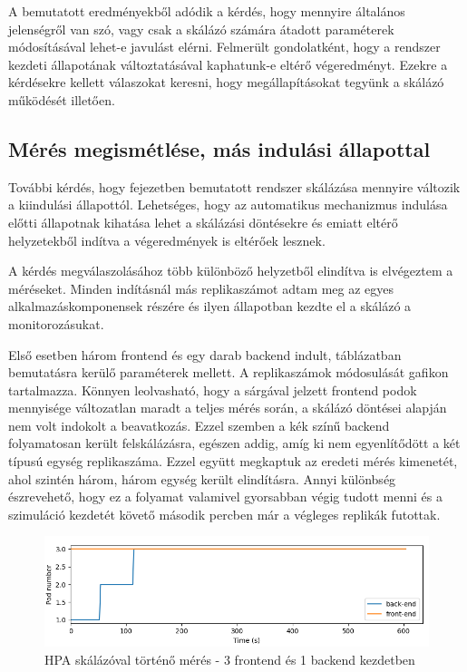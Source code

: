 A bemutatott eredményekből adódik a kérdés, hogy mennyire általános jelenségről van szó, vagy csak a skálázó számára átadott paraméterek módosításával lehet-e javulást elérni.
Felmerült gondolatként, hogy a rendszer kezdeti állapotának változtatásával kaphatunk-e eltérő végeredményt.
Ezekre a kérdésekre kellett válaszokat keresni, hogy megállapításokat tegyünk a skálázó működését illetően.


\subsection{Mérés megismétlése, más indulási állapottal}
További kérdés, hogy  fejezetben bemutatott rendszer skálázása mennyire változik a kiindulási állapottól.
Lehetséges, hogy az automatikus mechanizmus indulása előtti állapotnak kihatása lehet a skálázási döntésekre és emiatt eltérő helyzetekből indítva a végeredmények is eltérőek lesznek.

A kérdés megválaszolásához több különböző helyzetből elindítva is elvégeztem a méréseket. 
Minden indításnál más replikaszámot adtam meg az egyes alkalmazáskomponensek részére és ilyen állapotban kezdte el a skálázó a monitorozásukat.

Első esetben három frontend és egy darab backend indult,  táblázatban bemutatásra kerülő paraméterek mellett.
A replikaszámok módosulását  gafikon tartalmazza.
Könnyen leolvasható, hogy a sárgával jelzett frontend podok mennyisége változatlan maradt a teljes mérés során, a skálázó döntései alapján nem volt indokolt a beavatkozás.
Ezzel szemben a kék színű backend folyamatosan került felskálázásra, egészen addig, amíg ki nem egyenlítődött a két típusú egység replikaszáma.
Ezzel együtt megkaptuk az eredeti mérés kimenetét, ahol szintén három, három egység került elindításra.
Annyi különbség észrevehető, hogy ez a folyamat valamivel gyorsabban végig tudott menni és a szimuláció kezdetét követő második percben már a végleges replikák futottak.

\begin{figure}[!ht]
	\centering
	\includegraphics[width=150mm, keepaspectratio]{figures/HPA-scaling-from-3FE-1BE_label.png}
	\caption{HPA skálázóval történő mérés - 3 frontend és 1 backend kezdetben}
	\label{fig:HPA-scaling-from-3FE-1BE}
\end{figure}

